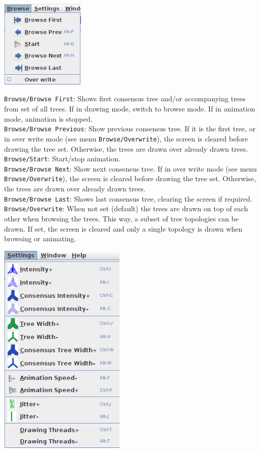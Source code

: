 \documentclass{article}
\begin{document}
\begin{center}
\includegraphics[width=4cm]{menubrowse.png}
\end{center}

\noindent
{\tt Browse/Browse First}: Shows first consensus tree and/or accompanying trees from set of
all trees. If in drawing mode, switch to browse mode. If in animation mode, animation is
stopped.\\
{\tt Browse/Browse Previous}: Show previous consensus tree. If it is the first tree,
or in over write mode (see menu {\tt Browse/Overwrite}), the screen is cleared before
drawing the tree set. Otherwise, the trees are drawn over already drawn trees.\\
{\tt Browse/Start}: Start/stop animation.\\
{\tt Browse/Browse Next}: Show next consensus tree. If in over write mode 
(see menu {\tt Browse/Overwrite}), the screen is cleared before drawing the tree set.
Otherwise, the trees are drawn over already drawn trees.\\
{\tt Browse/Browse Last}: Shows last consensus tree, clearing the screen if required.\\
{\tt Browse/Overwrite}: When not set (default) the trees are drawn on top of each other
when browsing the trees. This way, a subset of tree topologies can be drawn. 
If set, the screen is cleared and only a single topology is drawn when browsing or
animating.\\


\begin{center}
\includegraphics[width=6cm]{menusettings.png}
\end{center}
\end{document}
